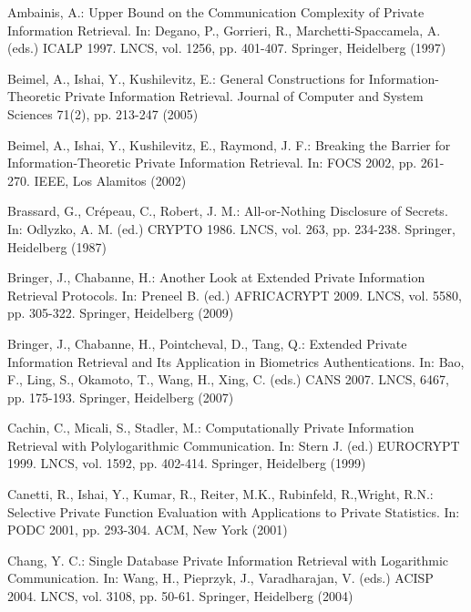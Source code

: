 \documentclass[JMC]{degruyter-journal}
\begin{document}
\begin{thebibliography}{00}

Ambainis, A.: Upper Bound on the Communication Complexity of Private
Information Retrieval. In:  Degano, P., Gorrieri, R.,
Marchetti-Spaccamela, A.   (eds.)  ICALP 1997. LNCS, vol. 1256,  pp.
401-407. Springer, Heidelberg (1997)


 Beimel, A., Ishai, Y., Kushilevitz, E.:
General Constructions for Information-Theoretic Private Information
Retrieval. Journal of Computer and System Sciences 71(2), pp.
213-247 (2005)

Beimel, A., Ishai, Y., Kushilevitz, E., Raymond, J. F.: Breaking the
 Barrier for Information-Theoretic Private
Information Retrieval. In:  FOCS 2002,  pp. 261-270. IEEE, Los
Alamitos (2002)


Brassard, G., Cr{\'{e}}peau, C., Robert, J. M.: All-or-Nothing
Disclosure of Secrets. In:  Odlyzko, A. M. (ed.) CRYPTO 1986. LNCS,
vol. 263, pp. 234-238.  Springer, Heidelberg (1987)


Bringer, J., Chabanne, H.: Another Look at Extended Private
Information Retrieval Protocols. In: Preneel B. (ed.) AFRICACRYPT
2009. LNCS, vol.  5580, pp. 305-322. Springer, Heidelberg (2009)

Bringer, J., Chabanne, H.,  Pointcheval, D.,  Tang, Q.: Extended
Private Information Retrieval and Its Application in Biometrics
Authentications. In:  Bao, F., Ling, S.,  Okamoto, T., Wang, H.,
Xing, C. (eds.)  CANS 2007. LNCS, 6467, pp. 175-193.  Springer,
Heidelberg (2007)




Cachin, C., Micali, S., Stadler, M.: Computationally Private
Information Retrieval with Polylogarithmic Communication. In: Stern
J. (ed.) EUROCRYPT 1999. LNCS, vol. 1592, pp. 402-414.  Springer,
Heidelberg (1999)

Canetti, R., Ishai, Y., Kumar, R., Reiter, M.K., Rubinfeld,
R.,Wright, R.N.: Selective Private Function Evaluation with
Applications to Private Statistics. In:  PODC 2001, pp. 293-304.
ACM, New York  (2001)




Chang, Y. C.: Single Database Private Information Retrieval with
Logarithmic Communication. In: Wang, H.,  Pieprzyk, J.,
Varadharajan, V. (eds.)  ACISP 2004. LNCS, vol. 3108, pp. 50-61.
Springer, Heidelberg (2004)




\end{thebibliography}
\end{document}
